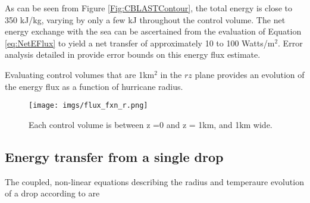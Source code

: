 \documentclass[10pt,a4paper]{article}
\begin{document}
As can be seen from Figure \ref{Fig:CBLASTContour}, the total energy is close to 350 kJ/kg, varying by only a few kJ throughout the control volume. The net energy exchange with the sea can be ascertained from the evaluation of Equation \ref{eq:NetEFlux} to yield a net transfer of approximately 10 to 100 Watts/m$^2$. Error analysis detailed in \citet{Bell2012} provide error bounds on this energy flux estimate.

Evaluating control volumes that are 1km$^2$ in the $rz$ plane provides an evolution of the energy flux as a function of hurricane radius. 

\begin{figure}[h!]
\centering
\texttt{[image: imgs/flux\_fxn\_r.png]}
\caption{Each control volume is between z =0 and z = 1km, and 1km wide. \label{Fig:CBLAST_Flux_fxn_r}}
\end{figure}


\subsection{Energy transfer from a single drop}
The coupled, non-linear equations describing the radius and temperaure evolution of a drop according to \citet{Pruppacher1978} are
\end{document}
